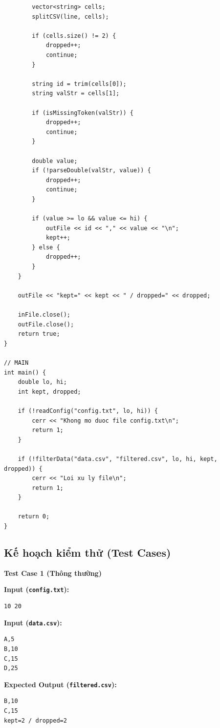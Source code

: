 \begin{lstlisting}
        vector<string> cells;
        splitCSV(line, cells);

        if (cells.size() != 2) {
            dropped++;
            continue;
        }

        string id = trim(cells[0]);
        string valStr = cells[1];

        if (isMissingToken(valStr)) {
            dropped++;
            continue;
        }

        double value;
        if (!parseDouble(valStr, value)) {
            dropped++;
            continue;
        }

        if (value >= lo && value <= hi) {
            outFile << id << "," << value << "\n";
            kept++;
        } else {
            dropped++;
        }
    }

    outFile << "kept=" << kept << " / dropped=" << dropped;

    inFile.close();
    outFile.close();
    return true;
}

// MAIN
int main() {
    double lo, hi;
    int kept, dropped;

    if (!readConfig("config.txt", lo, hi)) {
        cerr << "Khong mo duoc file config.txt\n";
        return 1;
    }

    if (!filterData("data.csv", "filtered.csv", lo, hi, kept, dropped)) {
        cerr << "Loi xu ly file\n";
        return 1;
    }

    return 0;
}
\end{lstlisting}

\subsection{Kế hoạch kiểm thử (Test Cases)}

\textbf{Test Case 1 (Thông thường)}

\textbf{Input (\texttt{config.txt}):}
\begin{lstlisting}
10 20
\end{lstlisting}

\textbf{Input (\texttt{data.csv}):}
\begin{lstlisting}
A,5
B,10
C,15
D,25
\end{lstlisting}

\textbf{Expected Output (\texttt{filtered.csv}):}
\begin{lstlisting}
B,10
C,15
kept=2 / dropped=2
\end{lstlisting}

\vspace{0.5cm}

